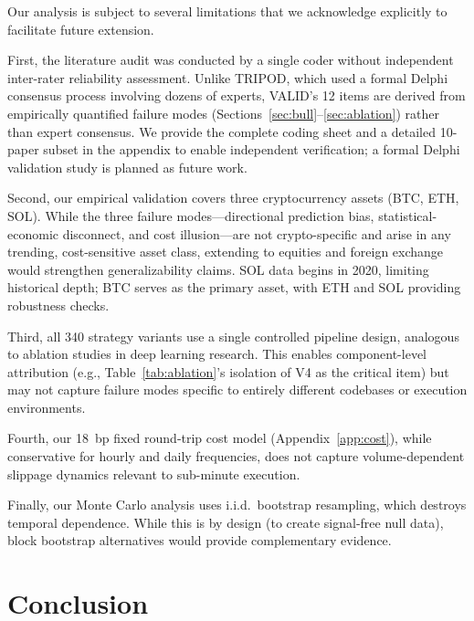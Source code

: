 \documentclass[sigconf,anonymous,review]{acmart}
\begin{document}
Our analysis is subject to several limitations that we
acknowledge explicitly to facilitate future extension.

First, the literature audit was conducted by a single coder without
independent inter-rater reliability assessment. Unlike TRIPOD, which
used a formal Delphi consensus process involving dozens of experts,
VALID's 12 items are derived from empirically quantified failure modes
(Sections~\ref{sec:bull}--\ref{sec:ablation}) rather than expert consensus. We provide the
complete coding sheet and a detailed 10-paper subset in the appendix
to enable independent verification; a formal Delphi validation study
is planned as future work.

Second, our empirical validation covers three cryptocurrency assets
(BTC, ETH, SOL). While the three failure modes---directional
prediction bias, statistical-economic disconnect, and cost
illusion---are not crypto-specific and arise in any trending,
cost-sensitive asset class, extending to equities and foreign exchange
would strengthen generalizability claims. SOL data begins in 2020,
limiting historical depth; BTC serves as the primary asset, with ETH
and SOL providing robustness checks.

Third, all 340 strategy variants use a single controlled pipeline
design, analogous to ablation studies in deep learning research. This
enables component-level attribution (e.g., Table~\ref{tab:ablation}'s
isolation of V4 as the critical item) but may not capture failure
modes specific to entirely different codebases or execution
environments.

Fourth, our 18~bp fixed round-trip cost model
(Appendix~\ref{app:cost}), while conservative for hourly and daily
frequencies, does not capture volume-dependent slippage dynamics
relevant to sub-minute execution.

Finally, our Monte Carlo analysis uses i.i.d.\ bootstrap resampling,
which destroys temporal dependence. While this is by design (to create
signal-free null data), block bootstrap alternatives would provide
complementary evidence.


\section{Conclusion}
\label{sec:conclusion}
\end{document}
